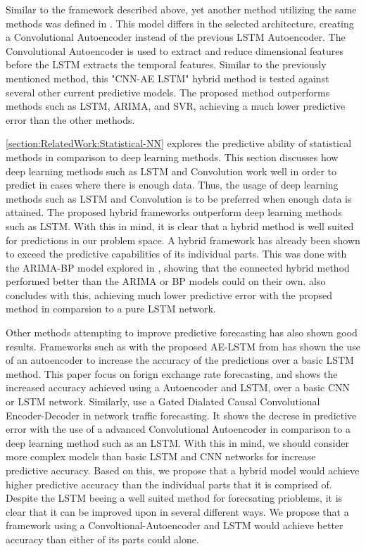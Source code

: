 Similar to the framework described above, yet another method utilizing the same methods was defined in \cite{Zaho2019}.
This model differs in the selected architecture, creating a Convolutional Autoencoder instead of the previous LSTM Autoencoder.
The Convolutional Autoencoder is used to extract and reduce dimensional features before the LSTM extracts the temporal features.
Similar to the previously mentioned method, this "CNN-AE LSTM" hybrid method is tested against several other current predictive models.
The proposed method outperforms methods such as LSTM, ARIMA, and SVR, achieving a much lower predictive error than the other methods.


\ref{section:RelatedWork:Statistical-NN} explores the predictive ability of statistical methods in comparison to deep learning methods.
This section discusses how deep learning methods such as LSTM and Convolution work well in order to predict in cases where there is enough data.
Thus, the usage of deep learning methods such as LSTM and Convolution is to be preferred when enough data is attained.
The proposed hybrid frameworks outperform deep learning methods such as LSTM.
With this in mind, it is clear that a hybrid method is well suited for predictions in our problem space.
A hybrid framework has already been shown to exceed the predictive capabilities of its individual parts.
This was done with the ARIMA-BP model explored in \cite{Bowen2020}, showing that the connected hybrid method performed better than the ARIMA or BP models could on their own.
\cite{Zhao2019} also concludes with this, achieving much lower predictive error with the propsed method in comparsion to a pure LSTM network.

Other methods attempting to improve predictive forecasting has also shown good results.
Frameworks such as with the proposed AE-LSTM from \cite{VanHoa2021} has shown the use of an autoencoder to increase the accuracy of the predictions over a basic LSTM method.
This paper focus on forign exchange rate forecasting, and shows the increased accuracy achieved using a Autoencoder and LSTM, over a basic CNN or LSTM network.
Similarly, \cite{Zhang2020} use a Gated Dialated Causal Convolutional Encoder-Decoder in network traffic forecasting.
It shows the decrese in predictive error with the use of a advanced Convolutional Autoencoder in comparison to a deep learning method such as an LSTM.
With this in mind, we should consider more complex models than basic LSTM and CNN networks for increase predictive accuracy.
Based on this, we propose that a hybrid model would achieve higher predictive accuracy than the individual parts that it is comprised of.
Despite the LSTM beeing a well suited method for forecsating prioblems, it is clear that it can be improved upon in several different ways.
We propose that a framework using a Convoltional-Autoencoder and LSTM would achieve better accuracy than either of its parts could alone.


